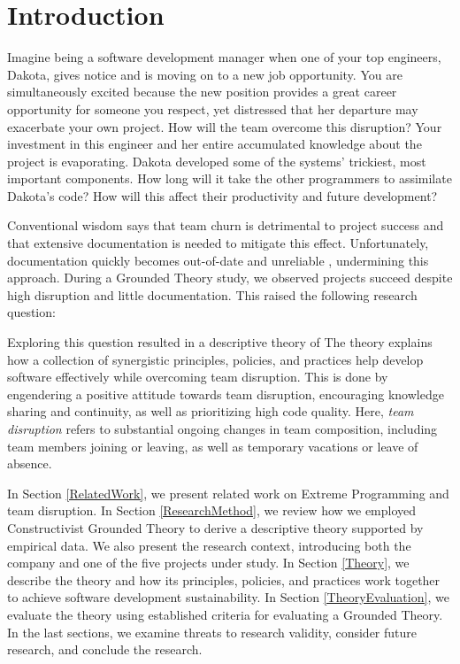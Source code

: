 

\section{Introduction}
Imagine being a software development manager when one of your top engineers, Dakota, gives notice and is moving on to a new job opportunity. You are simultaneously excited because the new position provides a great career opportunity for someone you respect, yet distressed that her departure may exacerbate your own project. How will the team overcome this disruption? Your investment in this engineer and her entire accumulated knowledge about the project is evaporating. Dakota developed some of the systems' trickiest, most important components. How long will it take the other programmers to assimilate Dakota's code?  How will this affect their productivity and future development?


Conventional wisdom says that team churn is detrimental to project success and that extensive documentation is needed to mitigate this effect. Unfortunately, documentation quickly becomes out-of-date and unreliable \cite{Lethbridge2003Documentation}, undermining this approach. During a Grounded Theory study, we observed projects succeed despite high disruption and little documentation. This raised the following research question: 

Exploring this question resulted in a descriptive theory of  The theory explains how a collection of synergistic principles, policies, and practices help develop software effectively while overcoming team disruption. This is done by engendering a positive attitude towards team disruption, encouraging knowledge sharing and continuity, as well as prioritizing high code quality. Here, \textit{team disruption} refers to substantial ongoing changes in team composition, including team members joining or leaving, as well as temporary vacations or leave of absence. 

In Section \ref{RelatedWork}, we present related work on Extreme Programming and team disruption. In Section \ref{ResearchMethod}, we review how we employed Constructivist Grounded Theory to derive a descriptive theory supported by empirical data. We also present the research context, introducing both the company and one of the five projects under study. In Section \ref{Theory}, we describe the theory and how its principles, policies, and practices work together to achieve software development sustainability. In Section \ref{TheoryEvaluation}, we evaluate the theory using established criteria for evaluating a Grounded Theory. In the last sections, we examine threats to research validity, consider future research, and conclude the research.
